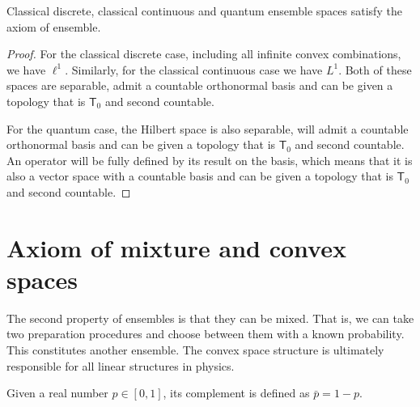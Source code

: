 \begin{prop}
	Classical discrete, classical continuous and quantum ensemble spaces satisfy the axiom of ensemble.
\end{prop}

\begin{proof}
	For the classical discrete case, including all infinite convex combinations, we have $\ell^1$. Similarly, for the classical continuous case we have $L^1$. Both of these spaces are separable, admit a countable orthonormal basis and can be given a topology that is $\textsf{T}_0$ and second countable.
	
	For the quantum case, the Hilbert space is also separable, will admit a countable orthonormal basis and can be given a topology that is $\textsf{T}_0$ and second countable. An operator will be fully defined by its result on the basis, which means that it is also a vector space with a countable basis and can be given a topology that is $\textsf{T}_0$ and second countable.
\end{proof}

\section{Axiom of mixture and convex spaces}

The second property of ensembles is that they can be mixed. That is, we can take two preparation procedures and choose between them with a known probability. This constitutes another ensemble. The convex space structure is ultimately responsible for all linear structures in physics.

\begin{defn}
	Given a real number $p \in [0,1]$, its complement is defined as $\bar{p} = 1-p$.
\end{defn}

